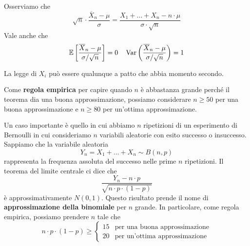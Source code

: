 \begin{observation}
	Osserviamo che
	\[
		\sqrt{n} \cdot \frac{\overline{X}_n - \mu}{\sigma} =
		\frac{X_1 + \dots + X_n - n \cdot \mu}{\sigma \cdot \sqrt{n}}
	\]
	Vale anche che
	\[
		\mathbb{E} \left[ \frac{\overline{X}_n - \mu}{\sigma / \sqrt{n}} \right] = 0 \quad
		\operatorname{Var} \left( \frac{\overline{X}_n - \mu}{\sigma / \sqrt{n}} \right) = 1
	\]
\end{observation}

\begin{observation}
	La legge di $X_i$ può essere qualunque a patto che abbia momento secondo.
\end{observation}

Come \textbf{regola empirica} per capire quando $n$ è abbastanza grande perché il teorema dia
una buona approssimazione, possiamo considerare $n \geq 50$ per una buona approssimazione e
$n \geq 80$ per un'ottima approssimazione.

Un caso importante è quello in cui abbiamo $n$ ripetizioni di un esperimento di Bernoulli in cui
consideriamo $n$ variabili aleatorie con esito successo o insuccesso. Sappiamo che la variabile
aleatoria
\[ Y_n = X_1 + \dots + X_n \sim B(n, p) \]
rappresenta la frequenza assoluta del successo nelle prime $n$ ripetizioni. Il teorema del limite
centrale ci dice che
\[ \frac{Y_n - n \cdot p}{\sqrt{n \cdot p \cdot (1-p)}} \]
è approssimativamente $N(0,1)$. Questo risultato prende il nome di
\textbf{approssimazione della binomiale} per $n$ grande. In particolare, come regola empirica,
possiamo prendere $n$ tale che
\[
	n \cdot p \cdot (1 - p) \geq \begin{cases}
		15 & \text{per una buona approssimazione} \\
		20 & \text{per un'ottima approssimazione}
	\end{cases}
\]

